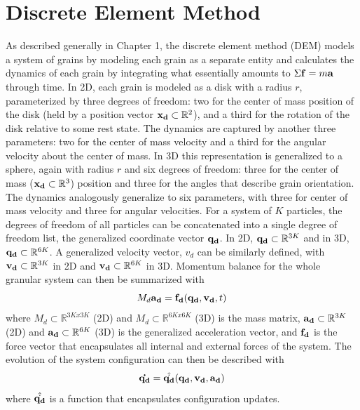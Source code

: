\chapter{Discrete Element Method}
As described generally in Chapter 1, the discrete element method (DEM) models a system of grains by modeling each grain as a separate entity and calculates the dynamics of each grain by integrating what essentially amounts to $\Sigma\bold{f}=m\bold{a}$ through time. In 2D, each grain is modeled as a disk with a radius $r$, parameterized by three degrees of freedom: two for the center of mass position of the disk (held by a position vector $\bold{x_d}\subset\mathbb{R}^2$), and a third for the rotation of the disk relative to some rest state. The dynamics are captured by another three parameters: two for the center of mass velocity and a third for the angular velocity about the center of mass. In 3D this representation is generalized to a sphere, again with radius $r$ and six degrees of freedom: three for the center of mass ($\bold{x_d}\subset\mathbb{R}^3$) position and three for the angles that describe grain orientation. The dynamics analogously generalize to six parameters, with three for center of mass velocity and three for angular velocities. For a system of $K$ particles, the degrees of freedom of all particles can be concatenated into a single degree of freedom list, the generalized coordinate vector $\bold{q_d}$. In 2D, $\bold{q_d}\subset\mathbb{R}^{3K}$ and in 3D, $\bold{q_d}\subset\mathbb{R}^{6K}$. A generalized velocity vector, $v_d$ can be similarly defined, with $\bold{v_d}\subset\mathbb{R}^{3K}$ in 2D and $ \bold{v_d}\subset\mathbb{R}^{6K}$ in 3D. Momentum balance for the whole granular system can then be summarized with
$$M_d\bold{a_d}=\bold{f_d}(\bold{q_d},\bold{v_d},t)$$
where $M_d\subset\mathbb{R}^{3Kx3K}$ (2D) and $M_d\subset\mathbb{R}^{6Kx6K}$ (3D) is the mass matrix, $\bold{a_d}\subset\mathbb{R}^{3K}$ (2D) and $\bold{a_d}\subset\mathbb{R}^{6K}$ (3D) is the generalized acceleration vector, and $\bold{f_d}$ is the force vector that encapsulates all internal and external forces of the system. The evolution of the system configuration can then be described with 
$$\bold{\dot{q_d}}=\hat{\dot{\bold{q_d}}}(\bold{q_d},\bold{v_d},\bold{a_d})$$
where $\hat{\dot{\bold{q_d}}}$ is a function that encapsulates configuration updates.

